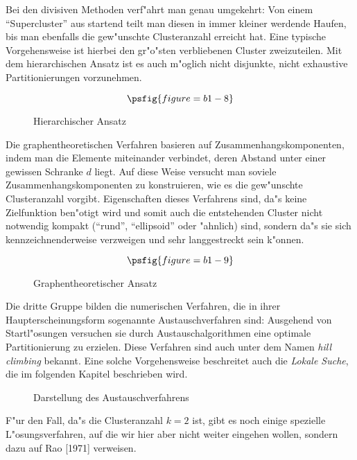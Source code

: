 Bei den divisiven Methoden verf"ahrt man genau umgekehrt: Von einem
"`Supercluster"' aus startend teilt man diesen in immer kleiner 
werdende Haufen, bis man ebenfalls die gew"unschte Clusteranzahl
erreicht hat. 
Eine typische Vorgehensweise ist hierbei den gr"o"sten verbliebenen
Cluster zweizuteilen. Mit dem hierarchischen Ansatz ist es auch
m"oglich nicht disjunkte, nicht exhaustive Partitionierungen
vorzunehmen.

\begin{figure}[htp]
\[\psfig{figure=b1-8}\]
\caption{Hierarchischer Ansatz}
\end{figure}

Die graphentheoretischen Verfahren basieren auf
Zusammenhangskomponenten, indem man die Elemente miteinander verbindet,
deren Abstand unter einer gewissen Schranke $d$ liegt. Auf diese Weise
versucht man soviele Zusammenhangskomponenten zu konstruieren, wie es
die gew"unschte Clusteranzahl vorgibt.
Eigenschaften dieses Verfahrens sind, da"s keine Zielfunktion ben"otigt
wird und somit auch die entstehenden Cluster nicht notwendig kompakt
("`rund"', "`ellipsoid"' oder "ahnlich) sind, sondern da"s sie sich
kennzeichnenderweise
verzweigen und sehr langgestreckt sein k"onnen.

\begin{figure}[htp]
\[\psfig{figure=b1-9}\]
\caption{Graphentheoretischer Ansatz}
\end{figure}

Die dritte Gruppe bilden die numerischen Verfahren, die in ihrer
Haupterscheinungsform sogenannte Austauschverfahren sind:
Ausgehend von Startl"osungen versuchen sie durch Austauschalgorithmen
eine optimale Partitionierung zu erzielen.
Diese Verfahren sind auch unter dem Namen {\em hill climbing} bekannt.
Eine solche Vorgehensweise beschreitet auch die {\em Lokale Suche}, die
im folgenden Kapitel beschrieben wird.

\begin{figure}[htp]
\begin{center}

\end{center}
\caption{Darstellung des Austauschverfahrens}
\end{figure}

F"ur den Fall, da"s die Clusteranzahl $k=2$ ist, gibt es noch einige
spezielle L"osungsverfahren, auf die wir hier aber nicht weiter
eingehen wollen, sondern dazu auf Rao [1971] verweisen.





